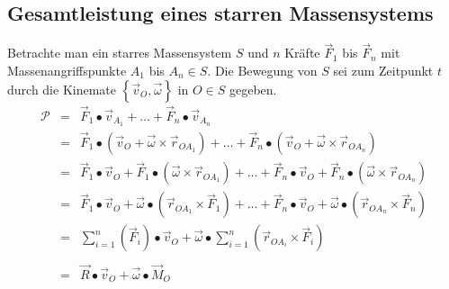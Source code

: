 \subsection{Gesamtleistung eines starren Massensystems}
Betrachte man ein starres Massensystem $S$ und $n$ Kräfte $\overrightarrow{F}_1$ bis $\overrightarrow{F}_n$ mit Massenangriffspunkte $A_1$ bis $A_n\in S$. Die Bewegung von $S$ sei zum Zeitpunkt $t$ durch die Kinemate $\left\{\overrightarrow{v}_O, \overrightarrow{\omega}\right\}$ in $O\in S$ gegeben.
\begin{equation}
\boxed{\begin{array}{lll}
\mathcal{P}&=&\overrightarrow{F}_1\bullet\overrightarrow{v}_{A_1}+\dotso+\overrightarrow{F}_n\bullet\overrightarrow{v}_{A_n}\\
&=&\overrightarrow{F}_1\bullet\left(\overrightarrow{v}_{O}+\overrightarrow{\omega}\times \overrightarrow{r}_{OA_1}\right)+\dotso+\overrightarrow{F}_n\bullet\left(\overrightarrow{v}_{O}+\overrightarrow{\omega}\times \overrightarrow{r}_{OA_n}\right)\\
&=&\overrightarrow{F}_1\bullet\overrightarrow{v}_O+\overrightarrow{F}_1\bullet \left(\overrightarrow{\omega}\times \overrightarrow{r}_{OA_1}\right)+\dotso+\overrightarrow{F}_n\bullet\overrightarrow{v}_O+\overrightarrow{F}_n\bullet \left(\overrightarrow{\omega}\times \overrightarrow{r}_{OA_n}\right)\\
&=&\overrightarrow{F}_1\bullet\overrightarrow{v}_O+\overrightarrow{\omega}\bullet \left(\overrightarrow{r}_{OA_1}\times \overrightarrow{F}_{1}\right)+\dotso+\overrightarrow{F}_n\bullet\overrightarrow{v}_O+\overrightarrow{\omega}\bullet \left(\overrightarrow{r}_{OA_n}\times \overrightarrow{F}_{n}\right)\\
&=&\displaystyle \sum_{i=1}^n\left(\overrightarrow{F}_i\right)\bullet\overrightarrow{v}_O+\overrightarrow{\omega}\bullet\displaystyle \sum_{i=1}^n\left(\overrightarrow{r}_{OA_i}\times \overrightarrow{F}_{i}\right)\\\\
&=&\overrightarrow{R}\bullet\overrightarrow{v}_O+\overrightarrow{\omega}\bullet\overrightarrow{M}_O\\
\end{array}}
\end{equation}